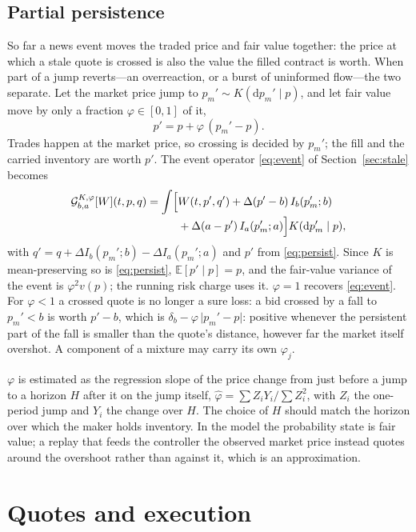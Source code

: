 \documentclass[11pt]{article}
\newcommand{\E}{\mathbb E}
\newcommand{\1}{\mathbf 1}
\newcommand{\dd}{\mathrm d}
\newcommand{\G}{\mathcal G}
\begin{document}
\subsection{Partial persistence}
\label{sec:persistence}
So far a news event moves the traded price and fair value together: the price at
which a stale quote is crossed is also the value the filled contract is worth.
When part of a jump reverts---an overreaction, or a burst of uninformed flow---the
two separate. Let the market price jump to $p_m'\sim K(\dd p_m'\mid p)$, and let
fair value move by only a fraction $\varphi\in[0,1]$ of it,
\begin{equation}
 p'=p+\varphi\,(p_m'-p).
 \label{eq:persist}
\end{equation}
Trades happen at the market price, so crossing is decided by $p_m'$; the fill and
the carried inventory are worth $p'$. The event operator \eqref{eq:event} of
Section~\ref{sec:stale} becomes
\begin{align}
 \G^{K,\varphi}_{b,a}[W](t,p,q)=\int\Bigl[
 &W(t,p',q')+\Delta(p'-b)\,I_b(p_m';b)
 \notag\\[-2pt]
 &+\Delta(a-p')\,I_a(p_m';a)\Bigr]K(\dd p_m'\mid p),
 \label{eq:event-persist}
\end{align}
with $q'=q+\Delta I_b(p_m';b)-\Delta I_a(p_m';a)$ and $p'$ from \eqref{eq:persist}.
Since $K$ is mean-preserving so is \eqref{eq:persist}, $\E[p'\mid p]=p$, and the
fair-value variance of the event is $\varphi^2v(p)$; the running risk charge uses
it. $\varphi=1$ recovers \eqref{eq:event}. For $\varphi<1$ a crossed quote is no
longer a sure loss: a bid crossed by a fall to $p_m'<b$ is worth $p'-b$, which is
$\delta_b-\varphi\,\lvert p_m'-p\rvert$: positive whenever the persistent part of the
fall is smaller than the quote's distance, however far the market itself overshot.
A component of a mixture may carry its own $\varphi_j$.

$\varphi$ is estimated as the regression slope of the price change from just
before a jump to a horizon $H$ after it on the jump itself,
$\hat\varphi=\sum Z_iY_i/\sum Z_i^2$, with $Z_i$ the one-period jump and $Y_i$ the
change over $H$. The choice of $H$ should match the horizon over which the maker
holds inventory. In the model the probability state is fair value; a replay that
feeds the controller the observed market price instead quotes around the
overshoot rather than against it, which is an approximation.

\section{Quotes and execution}
\end{document}
